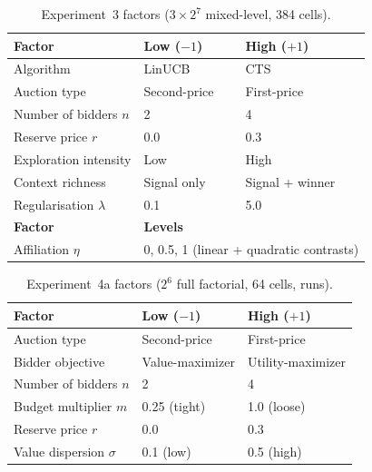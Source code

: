 \begin{table}[H]
\centering
\caption{Experiment~3 factors ($3 \times 2^7$ mixed-level, 384 cells).}
\label{tab:exp3_factors}
\small
\begin{tabular}{lll}
\toprule
\textbf{Factor} & \textbf{Low ($-1$)} & \textbf{High ($+1$)} \\
\midrule
Algorithm         & LinUCB & CTS \\
Auction type      & Second-price & First-price \\
Number of bidders $n$ & 2 & 4 \\
Reserve price $r$ & 0.0 & 0.3 \\
Exploration intensity & Low & High \\
Context richness  & Signal only & Signal + winner \\
Regularisation $\lambda$ & 0.1 & 5.0 \\
\midrule
\textbf{Factor} & \multicolumn{2}{l}{\textbf{Levels}} \\
\midrule
Affiliation $\eta$ & \multicolumn{2}{l}{0, 0.5, 1 (linear + quadratic contrasts)} \\
\bottomrule
\end{tabular}
\end{table}

\begin{table}[H]
\centering
\caption{Experiment~4a factors ($2^6$ full factorial, 64 cells, \ExpFourANobs{} runs).}
\label{tab:exp4a_factors}
\small
\begin{tabular}{lll}
\toprule
\textbf{Factor} & \textbf{Low ($-1$)} & \textbf{High ($+1$)} \\
\midrule
Auction type      & Second-price & First-price \\
Bidder objective  & Value-maximizer & Utility-maximizer \\
Number of bidders $n$ & 2 & 4 \\
Budget multiplier $m$ & 0.25 (tight) & 1.0 (loose) \\
Reserve price $r$ & 0.0 & 0.3 \\
Value dispersion $\sigma$ & 0.1 (low) & 0.5 (high) \\
\bottomrule
\end{tabular}
\end{table}